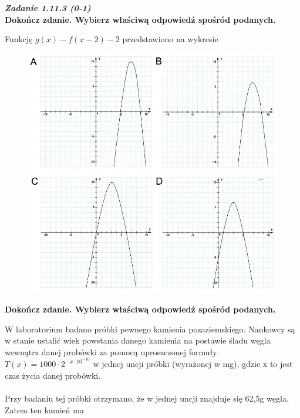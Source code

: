 \documentclass[12pt,a4paper]{article}
\theoremstyle{break}
\begin{document}
		\newpage
		\begin{mdframed}[%
			linecolor=white,%
			innertopmargin=\topskip,
			shadowsize=0,%
			innertopmargin=5,%
			innerbottommargin=5,%
			leftmargin=10,%
			rightmargin=10,%
			backgroundcolor=gray!20,%
			innertopmargin=0pt,]
			\vspace{0.2cm}
			\textbf{\textit{Zadanie 1.11.3 (0-1)}}\\
			\textbf{Dokończ zdanie. Wybierz właściwą odpowiedź spośród podanych.}
			
		\end{mdframed}
	
	Funkcję $g(x)-f(x-2)-2$ przedstawiono na wykresie
	
		\begin{figure}[h]
			\centering
			\includegraphics[scale=0.5]{pm2.jpeg}
		\end{figure}
	
	
	\begin{zad}[0-1]
		\textbf{Dokończ zdanie. Wybierz właściwą odpowiedź spośród podanych.}
	\end{zad} 
	
	W laboratorium badano próbki pewnego kamienia pozaziemskiego. Naukowcy są w stanie ustalić wiek powstania danego kamienia na postawie śladu węgla wewnątrz danej probówki za pomocą uproszczonej formuły $T(x)= 1000\cdot2^{-x \cdot 10^{-10}}$ w jednej uncji próbki (wyrażonej w mg), gdzie x to jest czas życia danej probówki.
	\\\\
	Przy badaniu tej próbki otrzymano, że w jednej uncji znajduje się 62,5g węgla. Zatem ten kamień ma
	
\end{document}

